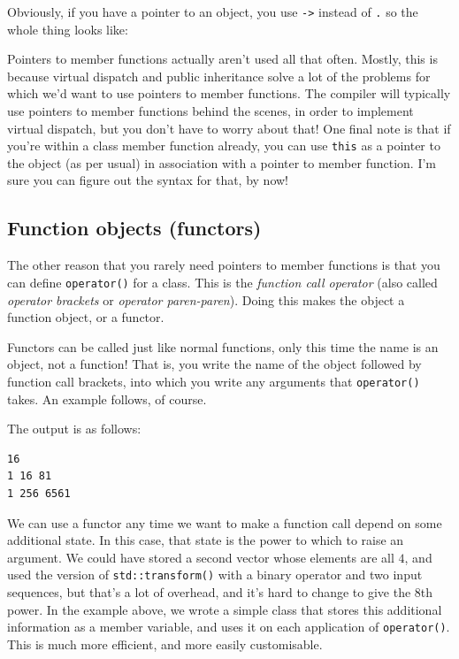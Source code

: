 \documentclass[a4paper]{scrartcl}
\begin{document}


Obviously, if you have a pointer to an object, you use \verb|->| instead of \verb|.| so the whole thing looks like:



Pointers to member functions actually aren't used all that often. Mostly, this is because virtual dispatch and public inheritance solve a lot of the problems for which we'd want to use pointers to member functions. The compiler will typically use pointers to member functions behind the scenes, in order to implement virtual dispatch, but you don't have to worry about that! One final note is that if you're within a class member function already, you can use \verb|this| as a pointer to the object (as per usual) in association with a pointer to member function. I'm sure you can figure out the syntax for that, by now!

\subsection{Function objects (functors)}
The other reason that you rarely need pointers to member functions is that you can define \verb|operator()| for a class. This is the \emph{function call operator} (also called \emph{operator brackets} or \emph{operator paren-paren}). Doing this makes the object a function object, or a functor.

Functors can be called just like normal functions, only this time the name is an object, not a function! That is, you write the name of the object followed by function call brackets, into which you write any arguments that \verb|operator()| takes. An example follows, of course.



The output is as follows:
\begin{verbatim}
16
1 16 81 
1 256 6561
\end{verbatim}

We can use a functor any time we want to make a function call depend on some additional state. In this case, that state is the power to which to raise an argument. We could have stored a second vector whose elements are all $4$, and used the version of \verb|std::transform()| with a binary operator and two input sequences, but that's a lot of overhead, and it's hard to change to give the 8th power. In the example above, we wrote a simple class that stores this additional information as a member variable, and uses it on each application of \verb|operator()|. This is much more efficient, and more easily customisable.
\end{document}
